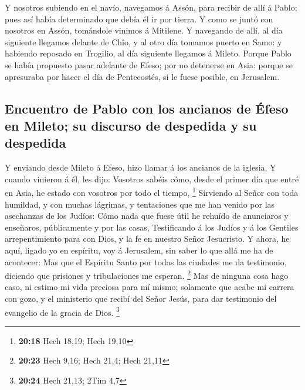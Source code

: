  Y nosotros subiendo en el navío, navegamos á Assón, para
recibir de allí á Pablo; pues así había determinado que debía él ir por
tierra.  Y como se juntó con nosotros en Assón, tomándole
vinimos á Mitilene.  Y navegando de allí, al día
siguiente llegamos delante de Chîo, y al otro día tomamos puerto en
Samo: y habiendo reposado en Trogilio, al día siguiente llegamos á
Mileto.  Porque Pablo se había propuesto pasar adelante
de Efeso; por no detenerse en Asia: porque se apresuraba por hacer el
día de Pentecostés, si le fuese posible, en Jerusalem.

\hypertarget{encuentro-de-pablo-con-los-ancianos-de-uxe9feso-en-mileto-su-discurso-de-despedida-y-su-despedida}{%
\subsection{Encuentro de Pablo con los ancianos de Éfeso en Mileto; su
discurso de despedida y su
despedida}\label{encuentro-de-pablo-con-los-ancianos-de-uxe9feso-en-mileto-su-discurso-de-despedida-y-su-despedida}}

 Y enviando desde Mileto á Efeso, hizo llamar á los
ancianos de la iglesia.  Y cuando vinieron á él, les
dijo: Vosotros sabéis cómo, desde el primer día que entré en Asia, he
estado con vosotros por todo el tiempo, \footnote{\textbf{20:18} Hech
  18,19; Hech 19,10}  Sirviendo al Señor con toda
humildad, y con muchas lágrimas, y tentaciones que me han venido por las
asechanzas de los Judíos:  Cómo nada que fuese útil he
rehuído de anunciaros y enseñaros, públicamente y por las casas,
 Testificando á los Judíos y á los Gentiles
arrepentimiento para con Dios, y la fe en nuestro Señor Jesucristo.
 Y ahora, he aquí, ligado yo en espíritu, voy á
Jerusalem, sin saber lo que allá me ha de acontecer:  Mas
que el Espíritu Santo por todas las ciudades me da testimonio, diciendo
que prisiones y tribulaciones me esperan. \footnote{\textbf{20:23} Hech
  9,16; Hech 21,4; Hech 21,11}  Mas de ninguna cosa hago
caso, ni estimo mi vida preciosa para mí mismo; solamente que acabe mi
carrera con gozo, y el ministerio que recibí del Señor Jesús, para dar
testimonio del evangelio de la gracia de Dios. \footnote{\textbf{20:24}
  Hech 21,13; 2Tim 4,7}

